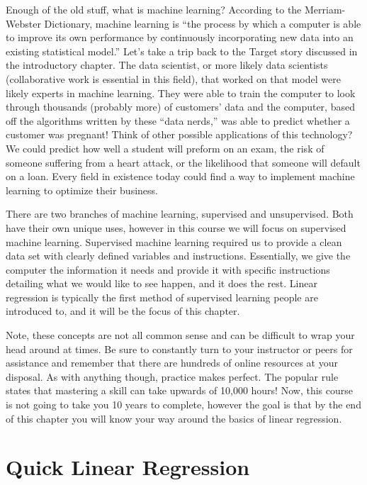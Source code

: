 \documentclass[
]{book}
\begin{document}
Enough of the old stuff, what is machine learning? According to the Merriam-Webster Dictionary, machine learning is ``the process by which a computer is able to improve its own performance by continuously incorporating new data into an existing statistical model.'' Let's take a trip back to the Target story discussed in the introductory chapter. The data scientist, or more likely data scientists (collaborative work is essential in this field), that worked on that model were likely experts in machine learning. They were able to train the computer to look through thousands (probably more) of customers' data and the computer, based off the algorithms written by these ``data nerds,'' was able to predict whether a customer was pregnant! Think of other possible applications of this technology? We could predict how well a student will preform on an exam, the risk of someone suffering from a heart attack, or the likelihood that someone will default on a loan. Every field in existence today could find a way to implement machine learning to optimize their business.

There are two branches of machine learning, supervised and unsupervised. Both have their own unique uses, however in this course we will focus on supervised machine learning. Supervised machine learning required us to provide a clean data set with clearly defined variables and instructions. Essentially, we give the computer the information it needs and provide it with specific instructions detailing what we would like to see happen, and it does the rest. Linear regression is typically the first method of supervised learning people are introduced to, and it will be the focus of this chapter.

Note, these concepts are not all common sense and can be difficult to wrap your head around at times. Be sure to constantly turn to your instructor or peers for assistance and remember that there are hundreds of online resources at your disposal. As with anything though, practice makes perfect. The popular rule states that mastering a skill can take upwards of 10,000 hours! Now, this course is not going to take you 10 years to complete, however the goal is that by the end of this chapter you will know your way around the basics of linear regression.

\hypertarget{quick-linear-regression}{%
\chapter{Quick Linear Regression}\label{quick-linear-regression}}
\end{document}

